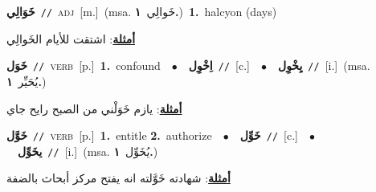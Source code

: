 \documentclass[10pt,a4paper,twoside]{article} %
\begin{document}
\begin{multicols}{2}
{\setlength\topsep{0pt}\textbf{\foreignlanguage{arabic}{خَوَالِي}}\ {\color{gray}\texttt{//}\color{black}}\ \textsc{adj}\ [m.]\ \color{gray}(msa. \foreignlanguage{arabic}{خَوالِي}~\foreignlanguage{arabic}{\textbf{١.}})\color{black}\ \textbf{1.}~halcyon (days)\  \begin{flushright}\color{gray}\foreignlanguage{arabic}{\textbf{\underline{\foreignlanguage{arabic}{أمثلة}}}: اشتقت للأيام الخَوالِي}\end{flushright}\color{black}} \vspace{2mm}

{\setlength\topsep{0pt}\textbf{\foreignlanguage{arabic}{خَوَل}}\ {\color{gray}\texttt{//}\color{black}}\ \textsc{verb}\ [p.]\ \textbf{1.}~confound\ \ $\bullet$\ \ \setlength\topsep{0pt}\textbf{\foreignlanguage{arabic}{اِخْوِل}}\ {\color{gray}\texttt{//}\color{black}}\ [c.]\ \ $\bullet$\ \ \setlength\topsep{0pt}\textbf{\foreignlanguage{arabic}{يِخْوِل}}\ {\color{gray}\texttt{//}\color{black}}\ [i.]\ \color{gray}(msa. \foreignlanguage{arabic}{يُحَيِّر}~\foreignlanguage{arabic}{\textbf{١.}})\color{black}\  \begin{flushright}\color{gray}\foreignlanguage{arabic}{\textbf{\underline{\foreignlanguage{arabic}{أمثلة}}}: يازم خَوَلْني من الصبح رايح جاي}\end{flushright}\color{black}} \vspace{2mm}

{\setlength\topsep{0pt}\textbf{\foreignlanguage{arabic}{خَوَّل}}\ {\color{gray}\texttt{//}\color{black}}\ \textsc{verb}\ [p.]\ \textbf{1.}~entitle  \textbf{2.}~authorize\ \ $\bullet$\ \ \setlength\topsep{0pt}\textbf{\foreignlanguage{arabic}{خَوِّل}}\ {\color{gray}\texttt{//}\color{black}}\ [c.]\ \ $\bullet$\ \ \setlength\topsep{0pt}\textbf{\foreignlanguage{arabic}{يخَوِّل}}\ {\color{gray}\texttt{//}\color{black}}\ [i.]\ \color{gray}(msa. \foreignlanguage{arabic}{يُخَوِّل}~\foreignlanguage{arabic}{\textbf{١.}})\color{black}\  \begin{flushright}\color{gray}\foreignlanguage{arabic}{\textbf{\underline{\foreignlanguage{arabic}{أمثلة}}}: شهادته خَوَّلته انه يفتح مركز أبحاث بالضفة}\end{flushright}\color{black}} \vspace{2mm}


\end{multicols}
\end{document}
